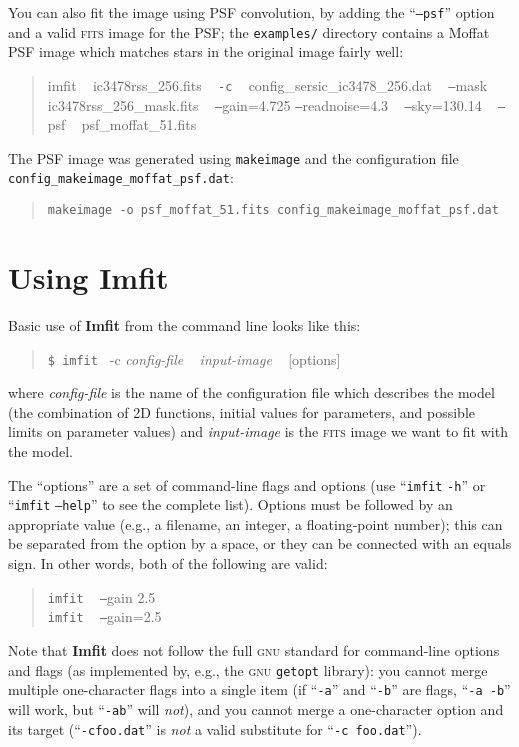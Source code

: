 \documentclass[10pt,a4paper,article]{memoir}
\newcommand{\imfit}{\textbf{Imfit}}
\newcommand{\Imfit}{\textbf{Imfit}}
\newcommand{\imfitprog}{\texttt{imfit}}
\newcommand{\makeimage}{\texttt{makeimage}}
\begin{document}
You can also fit the image using PSF convolution, by adding the ``\texttt{--psf}'' option and a
valid \textsc{fits} image for the PSF; the \texttt{examples/} directory contains a Moffat PSF image which
matches stars in the original image fairly well:
\begin{quote}
imfit ~ ic3478rss\_256.fits ~ \texttt{-c} ~ config\_sersic\_ic3478\_256.dat ~ \texttt{--}mask ~ ic3478rss\_256\_mask.fits ~ \texttt{--}gain=4.725 \texttt{--}readnoise=4.3 ~ \texttt{--}sky=130.14 ~ \texttt{--}psf ~ psf\_moffat\_51.fits
\end{quote}


The PSF image was generated using \makeimage{} and the configuration
file \\
\texttt{config\_makeimage\_moffat\_psf.dat}:
\begin{quote}
\texttt{makeimage -o psf\_moffat\_51.fits config\_makeimage\_moffat\_psf.dat}
\end{quote}




\chapter{Using \Imfit{}}\label{sec:using-imfit}

Basic use of \imfit{} from the command line looks like this:
\begin{quote}
  \texttt{\$ \imfitprog{} }  -c \textit{config-file} ~ \textit{input-image} ~ [options]
\end{quote}
where \textit{config-file} is the name of the configuration file
which describes the model (the combination of 2D functions, initial values
for parameters, and possible limits on parameter values) and \textit{input-image}
is the \textsc{fits} image we want to fit with the model.

The ``options'' are a set of command-line flags and options (use ``\imfitprog{} \texttt{-h}''
or ``\imfitprog{} \texttt{--help}'' to see the complete list). Options must be followed by
an appropriate value (e.g., a filename, an integer, a floating-point number); this can
be separated from the option by a space, or they can be connected with an equals sign.
In other words, both of the following are valid:
\begin{quote}
\imfitprog{} ~ \texttt{--}gain 2.5 \\
\imfitprog{} ~ \texttt{--}gain=2.5
\end{quote}
Note that \imfit{} does not follow the full \textsc{gnu} standard for
command-line options and flags (as implemented by, e.g., the \textsc{gnu}
\texttt{getopt} library): you cannot merge multiple one-character flags
into a single item (if ``\texttt{-a}'' and ``\texttt{-b}'' are flags,
``\texttt{-a -b}'' will work, but ``\texttt{-ab}'' will \textit{not}), and you
cannot merge a one-character option and its target
(``\texttt{-cfoo.dat}'' is \textit{not} a valid substitute for
``\texttt{-c foo.dat}'').
\end{document}

